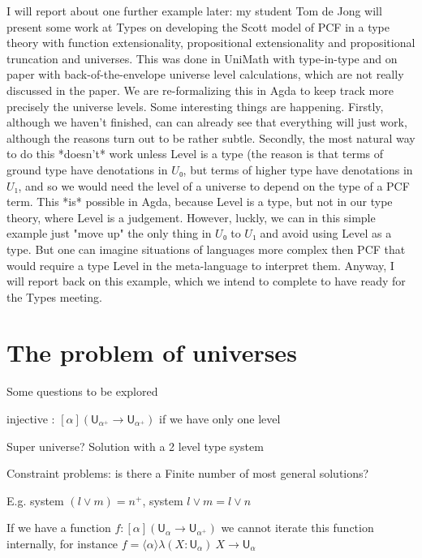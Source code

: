 \documentclass[11pt,a4paper]{article}
\newcommand{\lam}[2]{{\langle}#1{\rangle}#2}
\def\UU{\mathsf{U}}
\begin{document}
I will report about one further example later: my student Tom de Jong
will present some work at Types on developing the Scott model of PCF
in a type theory with function extensionality, propositional
extensionality and propositional truncation and universes. This was
done in UniMath with type-in-type and on paper with
back-of-the-envelope universe level calculations, which are not really
discussed in the paper. We are re-formalizing this in Agda to keep
track more precisely the universe levels. Some interesting things are
happening. Firstly, although we haven't finished, can can already see
that everything will just work, although the reasons turn out to be
rather subtle. Secondly, the most natural way to do this *doesn't*
work unless Level is a type (the reason is that terms of ground type
have denotations in $U₀$, but terms of higher type have denotations in
$U₁$, and so we would need the level of a universe to depend on the type
of a PCF term. This *is* possible in Agda, because Level is a type,
but not in our type theory, where Level is a judgement. However,
luckly, we can in this simple example just "move up" the only thing in
$U₀$ to $U₁$ and avoid using Level as a type. But one can imagine
situations of languages more complex then PCF that would require a
type Level in the meta-language to interpret them. Anyway, I will
report back on this example, which we intend to complete to have ready
for the Types meeting.


\section*{The problem of universes}

Some questions to be explored

\medskip

injective : $[\alpha](\UU_{\alpha^+}\rightarrow \UU_{\alpha^+})$ if we have only one level

Super universe? Solution with a 2 level type system

Constraint problems: is there a Finite number of most general solutions?

E.g. system $(l\vee m) = n^+$, system $l\vee m  = l\vee n$

If we have a function $f:[\alpha](\UU_{\alpha}\rightarrow \UU_{\alpha^+})$ we cannot iterate
this function internally, for instance  $f = \lam{\alpha}{\lambda (X:\UU_{\alpha})~X\rightarrow\UU_{\alpha}}$



\end{document}
